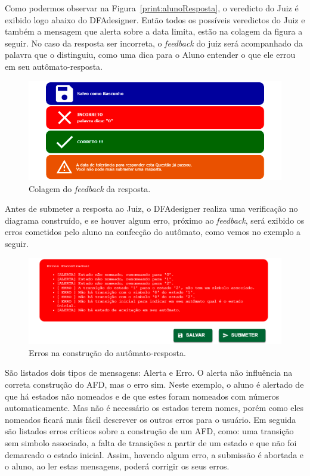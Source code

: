 \documentclass[
	12pt,				%
	openany,
	oneside,
	a4paper,			%
	english,			%
	brazil				%
	]{abntex2}
\begin{document}
  Como podermos observar na Figura~\ref{print:alunoResposta}, o veredicto do Juiz é exibido logo abaixo do DFAdesigner. Então todos os possíveis veredictos do Juiz e também a mensagem que alerta sobre a data limita, estão na colagem da figura a seguir. No caso da resposta ser incorreta, o \textit{feedback} do juiz será acompanhado da palavra que o distinguiu, como uma dica para o Aluno entender o que ele errou em seu autômato-resposta.

\begin{figure}[H]
  \centering
  \includegraphics[width=\textwidth]{prints/alunoFeedback.png}
  \caption{Colagem do \textit{feedback} da resposta.}
  \label{print:alunoFeedback}
  \vspace{-0.5cm}
\end{figure}
    
  Antes de submeter a resposta ao Juiz, o DFAdesigner realiza uma verificação no diagrama construído, e se houver algum erro, próximo ao \textit{feedback}, será exibido os erros cometidos pelo aluno na confecção do autômato, como vemos no exemplo a seguir.
  
\begin{figure}[H]
  \centering
  \includegraphics[width=\textwidth]{prints/alunoErros.png}
  \caption{Erros na construção do autômato-resposta.}
  \label{print:alunoErros}
  \vspace{-0.5cm}
\end{figure}

  São listados dois tipos de mensagens: Alerta e Erro. O alerta não influência na correta construção do AFD, mas o erro sim. Neste exemplo, o aluno é alertado de que há estados não nomeados e de que estes foram nomeados com números automaticamente. Mas não é necessário os estados terem nomes, porém como eles nomeados ficará mais fácil descrever os outros erros para o usuário. Em seguida são listados erros críticos sobre a construção de um AFD, como: uma transição sem simbolo associado, a falta de transições a partir de um estado e que não foi demarcado o estado inicial. Assim, havendo algum erro, a submissão é abortada e o aluno, ao ler estas mensagens, poderá corrigir os seus erros.
\end{document}
